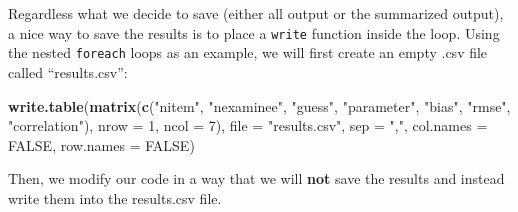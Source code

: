 \documentclass[
]{book}
\newenvironment{Shaded}{\begin{snugshade}}{\end{snugshade}}
\newcommand{\DataTypeTok}[1]{\textcolor[rgb]{0.13,0.29,0.53}{#1}}
\newcommand{\DecValTok}[1]{\textcolor[rgb]{0.00,0.00,0.81}{#1}}
\newcommand{\KeywordTok}[1]{\textcolor[rgb]{0.13,0.29,0.53}{\textbf{#1}}}
\newcommand{\NormalTok}[1]{#1}
\newcommand{\OtherTok}[1]{\textcolor[rgb]{0.56,0.35,0.01}{#1}}
\newcommand{\StringTok}[1]{\textcolor[rgb]{0.31,0.60,0.02}{#1}}
\begin{document}
Regardless what we decide to save (either all output or the summarized output), a nice way to save the results is to place a \texttt{write} function inside the loop. Using the nested \texttt{foreach} loops as an example, we will first create an empty .csv file called ``results.csv'':

\begin{Shaded}
\begin{Highlighting}[]
\KeywordTok{write.table}\NormalTok{(}\KeywordTok{matrix}\NormalTok{(}\KeywordTok{c}\NormalTok{(}\StringTok{"nitem"}\NormalTok{, }\StringTok{"nexaminee"}\NormalTok{, }\StringTok{"guess"}\NormalTok{, }\StringTok{"parameter"}\NormalTok{, }\StringTok{"bias"}\NormalTok{, }\StringTok{"rmse"}\NormalTok{, }\StringTok{"correlation"}\NormalTok{), }
                   \DataTypeTok{nrow =} \DecValTok{1}\NormalTok{, }
                   \DataTypeTok{ncol =} \DecValTok{7}\NormalTok{), }
            \DataTypeTok{file =} \StringTok{"results.csv"}\NormalTok{, }
            \DataTypeTok{sep =} \StringTok{","}\NormalTok{,}
            \DataTypeTok{col.names =} \OtherTok{FALSE}\NormalTok{, }
            \DataTypeTok{row.names =} \OtherTok{FALSE}\NormalTok{)}
\end{Highlighting}
\end{Shaded}

Then, we modify our code in a way that we will \textbf{not} save the results and instead write them into the results.csv file.
\end{document}
